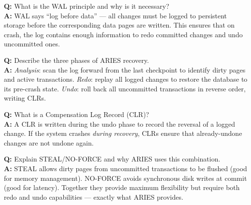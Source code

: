 \begin{interviewbox}
\textbf{Q:} What is the WAL principle and why is it necessary?\\[4pt]
\textbf{A:} WAL says ``log before data'' --- all changes must be logged to persistent storage before the corresponding data pages are written.  This ensures that on crash, the log contains enough information to redo committed changes and undo uncommitted ones.

\vspace{6pt}
\textbf{Q:} Describe the three phases of ARIES recovery.\\[4pt]
\textbf{A:} \emph{Analysis}: scan the log forward from the last checkpoint to identify dirty pages and active transactions.  \emph{Redo}: replay all logged changes to restore the database to its pre-crash state.  \emph{Undo}: roll back all uncommitted transactions in reverse order, writing CLRs.

\vspace{6pt}
\textbf{Q:} What is a Compensation Log Record (CLR)?\\[4pt]
\textbf{A:} A CLR is written during the undo phase to record the reversal of a logged change.  If the system crashes \emph{during recovery}, CLRs ensure that already-undone changes are not undone again.

\vspace{6pt}
\textbf{Q:} Explain STEAL/NO-FORCE and why ARIES uses this combination.\\[4pt]
\textbf{A:} STEAL allows dirty pages from uncommitted transactions to be flushed (good for memory management).  NO-FORCE avoids synchronous disk writes at commit (good for latency).  Together they provide maximum flexibility but require both redo and undo capabilities --- exactly what ARIES provides.
\end{interviewbox}
